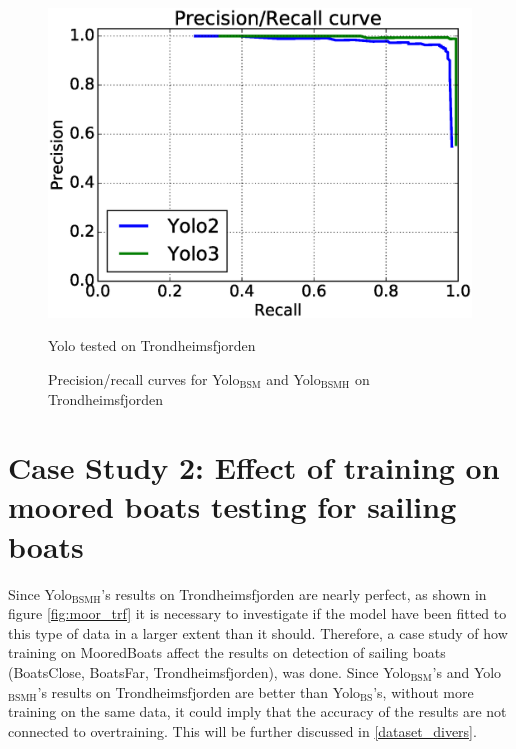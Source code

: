 \begin{figure}[h!]
  \centering
  \includegraphics[width=0.8\linewidth]{results/case_buildings/prec_recall/yolo/trf.eps}
  \caption{Yolo tested on Trondheimsfjorden}
  \label{fig:ex_trf_prec_rec_yolo}
\caption{Precision/recall curves for Yolo$_{\text{BSM}}$ and Yolo$_{\text{BSMH}}$ on Trondheimsfjorden}
\label{fig:yolo_trf_prec}
\end{figure}

\newpage
\clearpage

\section{Case Study 2: Effect of training on moored boats testing for sailing boats}
\label{sec:moored_boats}

Since Yolo$_{\text{BSMH}}$'s results on Trondheimsfjorden are nearly perfect, as shown in figure \ref{fig:moor_trf} it is necessary to investigate if the model have been fitted to this type of data in a larger extent than it should. Therefore, a case study of how training on MooredBoats affect the results on detection of sailing boats (BoatsClose, BoatsFar, Trondheimsfjorden), was done. Since Yolo$_{\text{BSM}}$'s and Yolo$_{\text{BSMH}}$'s results on Trondheimsfjorden are better than Yolo$_{\text{BS}}$'s, without more training on the same data, it could imply that the accuracy of the results are not connected to overtraining. This will be further discussed in \ref{dataset_divers}.


